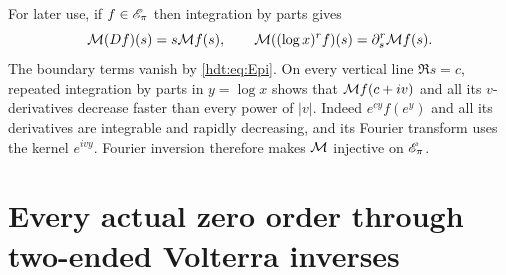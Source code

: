 \documentclass[11pt]{article}
\begin{document}
For later use, if $f\in\mathscr E_\pi$ then integration by parts gives
\begin{equation}\label{hdt:eq:Mellin-rules}
\mathcal M(Df)(s)=s\mathcal M f(s),\qquad
\mathcal M((\log x)^rf)(s)=\partial_s^r\mathcal M f(s).
\end{equation}
The boundary terms vanish by \eqref{hdt:eq:Epi}. On every vertical line
$\Re s=c$, repeated integration by parts in $y=\log x$ shows that
$\mathcal M f(c+iv)$ and all its $v$-derivatives decrease faster than every
power of $|v|$. Indeed $e^{cy}f(e^y)$ and all its derivatives are
integrable and rapidly decreasing, and its Fourier transform uses
the kernel $e^{ivy}$. Fourier inversion therefore makes $\mathcal M$
injective on $\mathscr E_\pi$.

\section{Every actual zero order through two-ended Volterra inverses}
\end{document}
